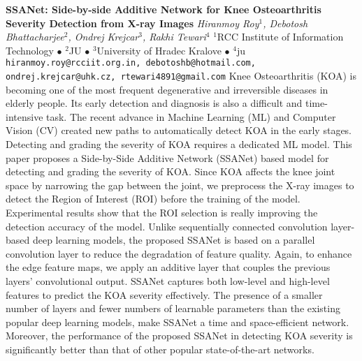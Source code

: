 
    \begin{conf-abstract}[]
        {\textbf{SSANet: Side-by-side Additive Network for Knee Osteoarthritis Severity Detection from X-ray Images}}
        {\textit{Hiranmoy Roy$^{1}$, Debotosh Bhattacharjee$^{2}$, Ondrej Krejcar$^{3}$, Rakhi Tewari$^{4}$}}
        {$^{1}$RCC Institute of Information Technology $\bullet$ $^{2}$JU $\bullet$ $^{3}$University of Hradec Kralove $\bullet$ $^{4}$ju}
        {\texttt{hiranmoy.roy@rcciit.org.in, debotoshb@hotmail.com, ondrej.krejcar@uhk.cz, rtewari4891@gmail.com}}
        {Knee Osteoarthritis (KOA) is becoming one of the most frequent degenerative and irreversible diseases in elderly people. Its early detection and diagnosis is also a difficult and time-intensive task. The recent advance in Machine Learning (ML) and Computer Vision (CV) created new paths to automatically detect KOA in the early stages. Detecting and grading the severity of KOA requires a dedicated ML model. This paper proposes a Side-by-Side Additive Network (SSANet) based model for detecting and grading the severity of KOA. Since KOA affects the knee joint space by narrowing the gap between the joint, we preprocess the X-ray images to detect the Region of Interest (ROI) before the training of the model. Experimental results show that the ROI selection is really improving the detection accuracy of the model. Unlike sequentially connected convolution layer-based deep learning models, the proposed SSANet is based on a parallel convolution layer to reduce the degradation of feature quality. Again, to enhance the edge feature maps, we apply an additive layer that couples the previous layers' convolutional output. SSANet captures both low-level and high-level features to predict the KOA severity effectively. The presence of a smaller number of layers and fewer numbers of learnable parameters than the existing popular deep learning models, make SSANet a time and space-efficient network. Moreover, the performance of the proposed SSANet in detecting KOA severity is significantly better than that of other popular state-of-the-art networks.}
    \end{conf-abstract}
        